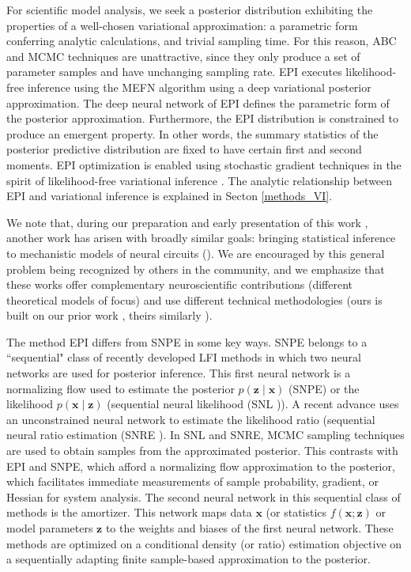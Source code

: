 \documentclass[11pt]{article}
\begin{document}
For scientific model analysis, we seek a posterior distribution exhibiting the properties of a well-chosen variational approximation: a parametric form conferring analytic calculations, and trivial sampling time.
For this reason, ABC and MCMC techniques are unattractive, since they only produce a set of parameter samples and have unchanging sampling rate.
EPI executes likelihood-free inference using the MEFN \cite{loaiza2017maximum} algorithm using a deep variational posterior approximation.
The deep neural network of EPI defines the parametric form of the posterior approximation.
Furthermore, the EPI distribution is constrained to produce an emergent property.
In other words, the summary statistics of the posterior predictive distribution are fixed to have certain first and second moments.
EPI optimization is enabled using stochastic gradient techniques in the spirit of likelihood-free variational inference \cite{tran2017hierarchical}.
The analytic relationship between EPI and variational inference is explained in Secton \ref{methods_VI}.

 We note that, during our preparation and early presentation of this work \cite{bittner2019degenerate, bittner2019examining}, another work has arisen with broadly similar goals: bringing statistical inference to mechanistic models of neural circuits (\cite{nonnenmacher2018sbi, desitler2019statistical, gonccalves2019training}).%
We are encouraged by this general problem being recognized by others in the community, and we emphasize that these works offer complementary neuroscientific contributions (different theoretical models of focus) and use different technical methodologies (ours is built on our prior work \cite{loaiza2017maximum}, theirs similarly \cite{LueckmannGoncalves_17}).

The method EPI differs from SNPE in some key ways.
SNPE belongs to a ``sequential" class of recently developed LFI methods in which two neural networks are used for posterior inference.
This first neural network is a normalizing flow used to estimate the posterior $p(\mathbf{z} \mid \mathbf{x})$ (SNPE) or the likelihood  $p(\mathbf{x} \mid \mathbf{z})$ (sequential neural likelihood (SNL \cite{papamakarios2019sequential})).
A recent advance uses an unconstrained neural network to estimate the likelihood ratio (sequential neural ratio estimation (SNRE \cite{hermans2020likelihood}).
In SNL and SNRE, MCMC sampling techniques are used to obtain samples from the approximated posterior.
This contrasts with EPI and SNPE, which afford a normalizing flow approximation to the posterior, which facilitates immediate measurements of sample probability, gradient, or Hessian for system analysis.
The second neural network in this sequential class of methods is the amortizer.  This network maps data $\mathbf{x}$ (or statistics $f(\mathbf{x}; \mathbf{z})$ or model parameters $\mathbf{z}$ to the weights and biases of the first neural network.
These methods are optimized on a conditional density (or ratio) estimation objective on a sequentially adapting finite sample-based approximation to the posterior.
\end{document}
